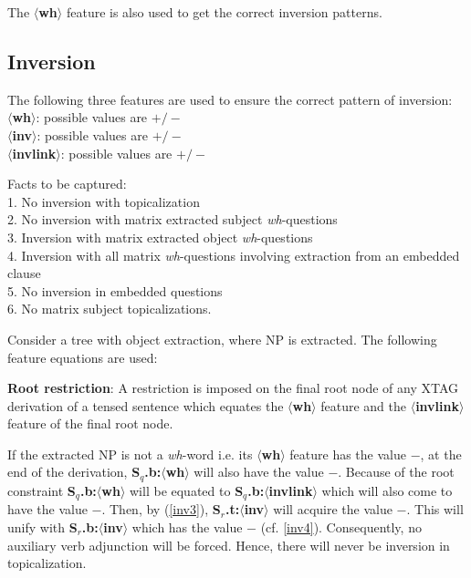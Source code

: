 The {\bf $\langle$wh$\rangle$} feature is also used to get the correct
inversion patterns.


\subsection{Inversion}
The following three features are used to ensure the correct pattern of
inversion:\\
{\bf $\langle$wh$\rangle$}: possible values are {\bf $+/-$}\\
{\bf $\langle$inv$\rangle$}: possible values are {\bf $+/-$}\\
{\bf $\langle$invlink$\rangle$}: possible values are {\bf $+/-$}

Facts to be captured:\\
1. No inversion with topicalization\\
2. No inversion with matrix extracted subject {\em wh}-questions\\
3. Inversion with matrix extracted object {\em wh}-questions\\
4. Inversion with all matrix {\em wh}-questions involving extraction from an
embedded clause\\
5. No inversion in embedded questions \\
6. No matrix subject topicalizations.

Consider a tree with object extraction, where NP is extracted. 
The following feature equations are used:\\


\noindent
{\bf Root restriction}: A restriction is imposed on the final root
node of any XTAG derivation of a tensed sentence which equates the
{\bf $\langle$wh$\rangle$} feature and the {\bf
$\langle$invlink$\rangle$} feature of the final root node.

If the extracted NP is not a {\em wh}-word i.e. its {\bf
$\langle$wh$\rangle$} feature has the value $-$, at the end of the
derivation, {\bf S$_{q}$.b:$\langle$wh$\rangle$} will also have the
value $-$. Because of the root constraint {\bf
S$_{q}$.b:$\langle$wh$\rangle$} will be equated to {\bf
S$_{q}$.b:$\langle$invlink$\rangle$} which will also come to have the
value $-$. Then, by (\ref{inv3}), {\bf
S$_{r}$.t:$\langle$inv$\rangle$} will acquire the value $-$. This will
unify with {\bf S$_{r}$.b:$\langle$inv$\rangle$} which has the value
$-$ (cf. \ref{inv4}). Consequently, no auxiliary verb adjunction will
be forced. Hence, there will never be inversion in topicalization.

